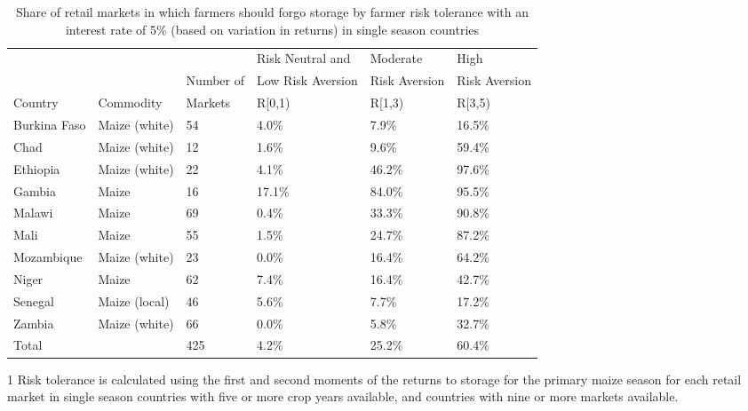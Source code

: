 \begin{table}[ht]
	\begin{threeparttable}[t]
		\centering
		\caption{Share of retail markets in which farmers should forgo storage by farmer risk tolerance with an interest rate of 5\% (based on variation in returns) in single season countries}
		\label{tab:risk_return_i}
		\begin{tabular}{|lll|lll|}
			\hline 
			&  & & Risk Neutral and & Moderate & High \\ 
			& & Number of  & Low Risk Aversion & Risk Aversion &  Risk Aversion\\ 
			Country&Commodity & Markets& R\in[0,1) &  R\in[1,3) & R\in[3,5) \\
			\hline
Burkina Faso & Maize (white) & 54 & 4.0\% & 7.9\% & 16.5\% \\ 
  Chad & Maize (white) & 12 & 1.6\% & 9.6\% & 59.4\% \\ 
  Ethiopia & Maize (white) & 22 & 4.1\% & 46.2\% & 97.6\% \\ 
  Gambia & Maize & 16 & 17.1\% & 84.0\% & 95.5\% \\ 
  Malawi & Maize & 69 & 0.4\% & 33.3\% & 90.8\% \\ 
  Mali & Maize & 55 & 1.5\% & 24.7\% & 87.2\% \\ 
  Mozambique & Maize (white) & 23 & 0.0\% & 16.4\% & 64.2\% \\ 
  Niger & Maize & 62 & 7.4\% & 16.4\% & 42.7\% \\ 
  Senegal & Maize (local) & 46 & 5.6\% & 7.7\% & 17.2\% \\ 
  Zambia & Maize (white) & 66 & 0.0\% & 5.8\% & 32.7\% \\ 
  \hline
  Total &  & 425 & 4.2\% & 25.2\% & 60.4\% \\ 
   \hline 
\end{tabular}
\begin{tablenotes}
\item [1] \footnotesize Risk tolerance is calculated using the first and second moments of the returns to storage for the primary maize season for each retail market in single season countries with five or more crop years available, and countries with nine or more markets available.
\end{tablenotes}
\end{threeparttable}
\end{table}
